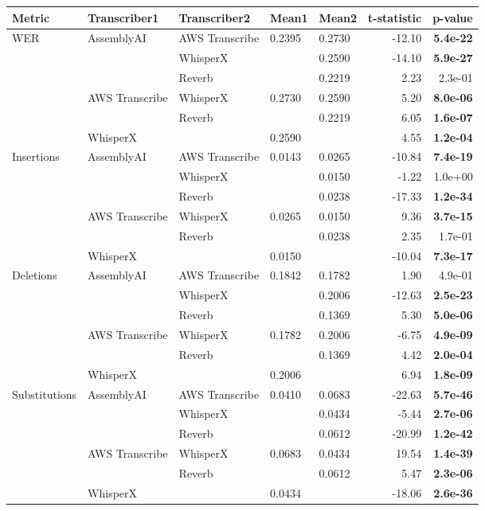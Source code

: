 \begin{tabular}{lllllrr}
\toprule
Metric & Transcriber1 & Transcriber2 & Mean1 & Mean2 & t-statistic & p-value \\
\midrule
WER & AssemblyAI & AWS Transcribe & 0.2395 & 0.2730 & -12.10 & \textbf{ 5.4e-22} \\
  &   & WhisperX &   & 0.2590 & -14.10 & \textbf{ 5.9e-27} \\
  &   & Reverb &   & 0.2219 & 2.23 &  2.3e-01 \\
  & AWS Transcribe & WhisperX & 0.2730 & 0.2590 & 5.20 & \textbf{ 8.0e-06} \\
  &   & Reverb &   & 0.2219 & 6.05 & \textbf{ 1.6e-07} \\
  & WhisperX &   & 0.2590 &   & 4.55 & \textbf{ 1.2e-04} \\
\cmidrule(r){2-7}
Insertions & AssemblyAI & AWS Transcribe & 0.0143 & 0.0265 & -10.84 & \textbf{ 7.4e-19} \\
  &   & WhisperX &   & 0.0150 & -1.22 &  1.0e+00 \\
  &   & Reverb &   & 0.0238 & -17.33 & \textbf{ 1.2e-34} \\
  & AWS Transcribe & WhisperX & 0.0265 & 0.0150 & 9.36 & \textbf{ 3.7e-15} \\
  &   & Reverb &   & 0.0238 & 2.35 &  1.7e-01 \\
  & WhisperX &   & 0.0150 &   & -10.04 & \textbf{ 7.3e-17} \\
\cmidrule(r){2-7}
Deletions & AssemblyAI & AWS Transcribe & 0.1842 & 0.1782 & 1.90 &  4.9e-01 \\
  &   & WhisperX &   & 0.2006 & -12.63 & \textbf{ 2.5e-23} \\
  &   & Reverb &   & 0.1369 & 5.30 & \textbf{ 5.0e-06} \\
  & AWS Transcribe & WhisperX & 0.1782 & 0.2006 & -6.75 & \textbf{ 4.9e-09} \\
  &   & Reverb &   & 0.1369 & 4.42 & \textbf{ 2.0e-04} \\
  & WhisperX &   & 0.2006 &   & 6.94 & \textbf{ 1.8e-09} \\
\cmidrule(r){2-7}
Substitutions & AssemblyAI & AWS Transcribe & 0.0410 & 0.0683 & -22.63 & \textbf{ 5.7e-46} \\
  &   & WhisperX &   & 0.0434 & -5.44 & \textbf{ 2.7e-06} \\
  &   & Reverb &   & 0.0612 & -20.99 & \textbf{ 1.2e-42} \\
  & AWS Transcribe & WhisperX & 0.0683 & 0.0434 & 19.54 & \textbf{ 1.4e-39} \\
  &   & Reverb &   & 0.0612 & 5.47 & \textbf{ 2.3e-06} \\
  & WhisperX &   & 0.0434 &   & -18.06 & \textbf{ 2.6e-36} \\
\bottomrule
\end{tabular}
